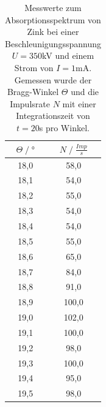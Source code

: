 \begin{table}[H]
    \centering
    \begin{tabular}{c c}
        \toprule
        $\Theta\;/\;°$& $N\;/\;\frac{Imp}{s}$\\
        \midrule
        18,0&    58,0\\
        18,1&    54,0\\
        18,2&    55,0\\
        18,3&    54,0\\
        18,4&    54,0\\
        18,5&    55,0\\
        18,6&    65,0\\
        18,7&    84,0\\
        18,8&    91,0\\
        18,9&    100,0\\
        19,0&    102,0\\
        19,1&    100,0\\
        19,2&    98,0\\
        19,3&   100,0\\
        19,4&    95,0\\
        19,5&    98,0\\
        \bottomrule
    \end{tabular}
    \caption{Messwerte zum Absorptionsspektrum von Zink bei einer Beschleunigungsspannung 
    $U=350$kV und einem Strom von $I=1$mA.\\
    Gemessen wurde der Bragg-Winkel $\Theta$ und die Impulsrate $N$ mit einer Integrationszeit
    von $t=20$s pro Winkel.}
\end{table}
